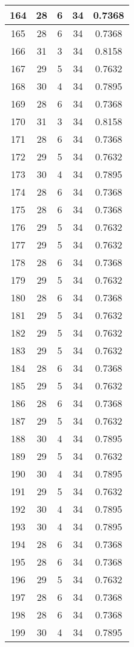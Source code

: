 \documentclass[letterpaper, 12pt]{article}
\begin{document}
\begin{longtable}{|c|c|c|c|c|}
\hline
164 & 28 & 6 & 34 & 0.7368 \\
\hline
165 & 28 & 6 & 34 & 0.7368 \\
\hline
166 & 31 & 3 & 34 & 0.8158 \\
\hline
167 & 29 & 5 & 34 & 0.7632 \\
\hline
168 & 30 & 4 & 34 & 0.7895 \\
\hline
169 & 28 & 6 & 34 & 0.7368 \\
\hline
170 & 31 & 3 & 34 & 0.8158 \\
\hline
171 & 28 & 6 & 34 & 0.7368 \\
\hline
172 & 29 & 5 & 34 & 0.7632 \\
\hline
173 & 30 & 4 & 34 & 0.7895 \\
\hline
174 & 28 & 6 & 34 & 0.7368 \\
\hline
175 & 28 & 6 & 34 & 0.7368 \\
\hline
176 & 29 & 5 & 34 & 0.7632 \\
\hline
177 & 29 & 5 & 34 & 0.7632 \\
\hline
178 & 28 & 6 & 34 & 0.7368 \\
\hline
179 & 29 & 5 & 34 & 0.7632 \\
\hline
180 & 28 & 6 & 34 & 0.7368 \\
\hline
181 & 29 & 5 & 34 & 0.7632 \\
\hline
182 & 29 & 5 & 34 & 0.7632 \\
\hline
183 & 29 & 5 & 34 & 0.7632 \\
\hline
184 & 28 & 6 & 34 & 0.7368 \\
\hline
185 & 29 & 5 & 34 & 0.7632 \\
\hline
186 & 28 & 6 & 34 & 0.7368 \\
\hline
187 & 29 & 5 & 34 & 0.7632 \\
\hline
188 & 30 & 4 & 34 & 0.7895 \\
\hline
189 & 29 & 5 & 34 & 0.7632 \\
\hline
190 & 30 & 4 & 34 & 0.7895 \\
\hline
191 & 29 & 5 & 34 & 0.7632 \\
\hline
192 & 30 & 4 & 34 & 0.7895 \\
\hline
193 & 30 & 4 & 34 & 0.7895 \\
\hline
194 & 28 & 6 & 34 & 0.7368 \\
\hline
195 & 28 & 6 & 34 & 0.7368 \\
\hline
196 & 29 & 5 & 34 & 0.7632 \\
\hline
197 & 28 & 6 & 34 & 0.7368 \\
\hline
198 & 28 & 6 & 34 & 0.7368 \\
\hline
199 & 30 & 4 & 34 & 0.7895 \\
\hline
\end{longtable}
\end{document}
